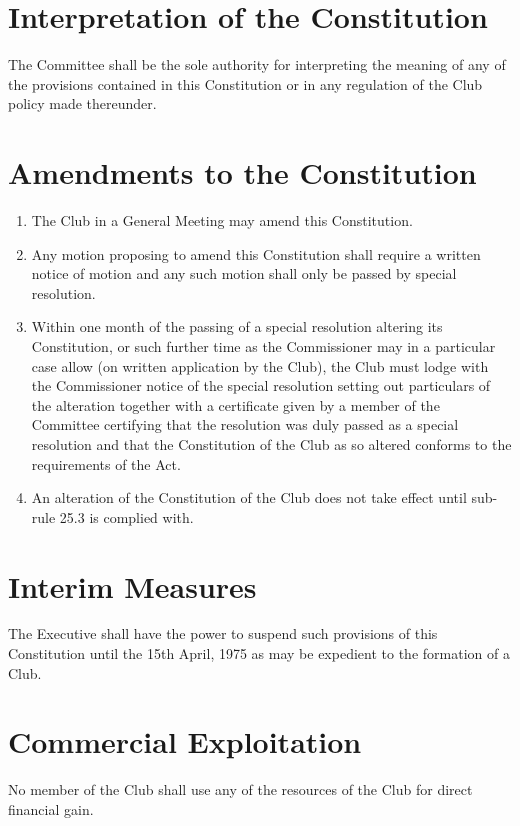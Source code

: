 \documentclass[11pt]{article} %
\begin{document}
\section{Interpretation of the Constitution}
The Committee shall be the sole authority for interpreting the meaning of any of the provisions contained in this Constitution or in any regulation of the Club policy made thereunder.

\section{Amendments to the Constitution}
\begin{enumerate}
	\item The Club in a General Meeting may amend this Constitution.
	\item Any motion proposing to amend this Constitution shall require a written notice of motion and any such motion shall only be passed by special resolution.
	\item Within one month of the passing of a special resolution altering its Constitution, or such further time as the Commissioner may in a particular case allow (on written application by the Club), the Club must lodge with the Commissioner notice of the special resolution setting out particulars of the alteration together with a certificate given by a member of the Committee certifying that the resolution was duly passed as a special resolution and that the Constitution of the Club as so altered conforms to the requirements of the Act.
	\item An alteration of the Constitution of the Club does not take effect until sub-rule 25.3 is complied with.
\end{enumerate}

\section{Interim Measures}
The Executive shall have the power to suspend such provisions of this Constitution until the 15th April, 1975 as may be expedient to the formation of a Club.

\section{Commercial Exploitation}
No member of the Club shall use any of the resources of the Club for direct financial gain.
\end{document}
